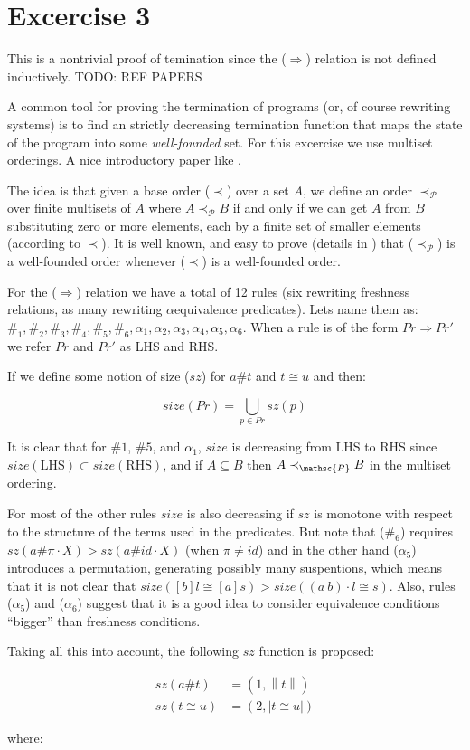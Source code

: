 \documentclass{article}
\newcommand\algRel{$\Rightarrow$}
\newcommand\fresh[2]{#1 \# #2}
\newcommand\eqa[2]{#1 \cong #2 }
\newcommand\abs[2]{[ #1] #2}
\newcommand\LHS{\textrm{LHS}}
\newcommand\RHS{\textrm{RHS}}
\newcommand{\doubl}[1]
           {\left\lVert#1\right\rVert}
\newcommand{\simpl}[1]
                      {\left|#1\right|}
\begin{document}
\section*{Excercise 3}

This is a nontrivial proof of temination since the (\algRel) relation
is not defined inductively. {TODO: REF PAPERS }

A common tool for proving the termination of programs (or, of course
rewriting systems) is to find an strictly decreasing termination
function that maps the state of the program into some
\emph{well-founded} set. For this excercise we use multiset orderings.
A nice introductory paper like \cite{DBLP:conf/icalp/DershowitzM79}.

The idea is that given a base order ($\prec$) over a set $A$, we
define an order $\prec_{\mathscr{P}}$ over finite multisets of $A$
where $A \prec_{\mathscr{P}} B$ if and only if we can get $A$ from $B$
substituting zero or more elements, each by a finite set of smaller
elements (according to $\prec$).  It is well known, and easy to prove
(details in \cite{DBLP:conf/icalp/DershowitzM79}) that
($\prec_{\mathscr{P}}$) is a well-founded order whenever ($\prec$) is
a well-founded order.

For the (\algRel) relation we have a total of 12 rules (six rewriting
freshness relations, as many rewriting $\alpha$equivalence
predicates). Lets name them as: \hfill\break $\#_1, \#_2, \#_3, \#_4,
\#_5, \#_6,\alpha_1, \alpha_2, \alpha_3, \alpha_4, \alpha_5,
\alpha_6$. When a rule is of the form $Pr \Rightarrow Pr'$ we refer
$Pr$ and $Pr'$ as LHS and RHS.

If we define some notion of size ($sz$) for $\fresh{a}{t}$ and
$\eqa{t}{u}$ and then:

$$size(Pr) = \bigcup_{p \in Pr} sz(p) $$

\noindent
It is clear that for $\#1$, $\#5$, and $\alpha_1$, $size$ is
decreasing from LHS to RHS since $size (\LHS) \subset size(\RHS)$, and
if $A \subseteq B$ then $A \prec_{\mathsc{P}} B$ in the multiset
ordering.

For most of the other rules $size$ is also decreasing if $sz$ is
monotone with respect to the structure of the terms used in the
predicates. But note that ($\#_6$) requires $sz(\fresh{a}{\pi \cdot
  X}) > sz(\fresh{a}{id \cdot X})$ (when $\pi \neq id$) and in the
other hand ($\alpha_5$) introduces a permutation, generating possibly
many suspentions, which means that it is not clear that
$size(\eqa{\abs{b}{l}}{\abs{a}{s}}) > size(\eqa{(a \: b) \cdot
  l}{s})$. Also, rules ($\alpha_5$) and ($\alpha_6$) suggest that it
is a good idea to consider equivalence conditions ``bigger'' than
freshness conditions.

Taking all this into account, the following $sz$ function is
proposed:

\begin{align*}
  sz(\fresh{a}{t}) &= (1, \doubl{t})\\
  sz(\eqa{t}{u}) &= (2, \simpl{\eqa{t}{u}})
\end{align*}

where:

\begin{align*}
  
\end{align*}




\end{document}

